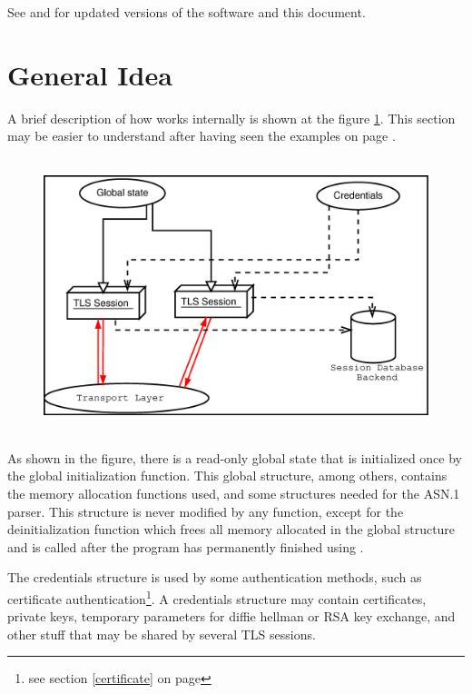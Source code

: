 \par
See 
and  
for updated versions of the \gnutls{} software and this document.

\section{General Idea}
A brief description of how \gnutls{} works internally is shown at
the figure \ref{fig:internals}. This section may be easier to understand
after having seen the examples on page \pageref{examples}.

\begin{figure}[htp]
\includegraphics[height=8cm,width=12cm]{internals}
\label{fig:internals}
\end{figure}

\par
As shown in the figure, there is a read-only global state that
is initialized once by the global initialization function.
This global structure, among others, contains the memory allocation
functions used, and some structures needed for the ASN.1 parser.
This structure is never modified by any \gnutls{} function, except
for the deinitialization function which frees all memory allocated in
the global structure and is called after the program has permanently finished 
using \gnutls{}.

\par
The credentials structure is used by some authentication methods,
such as certificate authentication\footnote{see section \ref{certificate} on page \pageref{certificate}}.
A credentials structure may contain certificates, private keys, temporary parameters 
for diffie hellman or RSA key exchange, and other stuff that may be shared
by several TLS sessions. 

